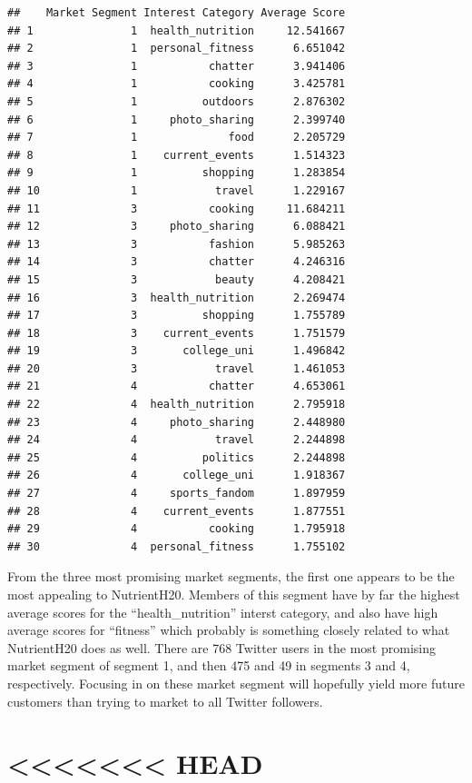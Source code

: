 \documentclass[
]{article}
\begin{document}
\begin{verbatim}
##    Market Segment Interest Category Average Score
## 1               1  health_nutrition     12.541667
## 2               1  personal_fitness      6.651042
## 3               1           chatter      3.941406
## 4               1           cooking      3.425781
## 5               1          outdoors      2.876302
## 6               1     photo_sharing      2.399740
## 7               1              food      2.205729
## 8               1    current_events      1.514323
## 9               1          shopping      1.283854
## 10              1            travel      1.229167
## 11              3           cooking     11.684211
## 12              3     photo_sharing      6.088421
## 13              3           fashion      5.985263
## 14              3           chatter      4.246316
## 15              3            beauty      4.208421
## 16              3  health_nutrition      2.269474
## 17              3          shopping      1.755789
## 18              3    current_events      1.751579
## 19              3       college_uni      1.496842
## 20              3            travel      1.461053
## 21              4           chatter      4.653061
## 22              4  health_nutrition      2.795918
## 23              4     photo_sharing      2.448980
## 24              4            travel      2.244898
## 25              4          politics      2.244898
## 26              4       college_uni      1.918367
## 27              4     sports_fandom      1.897959
## 28              4    current_events      1.877551
## 29              4           cooking      1.795918
## 30              4  personal_fitness      1.755102
\end{verbatim}

From the three most promising market segments, the first one appears to
be the most appealing to NutrientH20. Members of this segment have by
far the highest average scores for the ``health\_nutrition'' interst
category, and also have high average scores for ``fitness'' which
probably is something closely related to what NutrientH20 does as well.
There are 768 Twitter users in the most promising market segment of
segment 1, and then 475 and 49 in segments 3 and 4, respectively.
Focusing in on these market segment will hopefully yield more future
customers than trying to market to all Twitter followers.

\hypertarget{head}{%
\section{\textless\textless\textless\textless\textless\textless\textless{}
HEAD}\label{head}}
\end{document}
